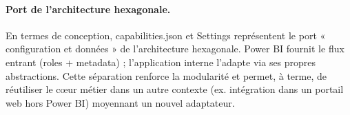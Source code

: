 \paragraph{Port de l’architecture hexagonale.} En termes de conception, capabilities.json et Settings représentent le port « configuration et données » de l’architecture hexagonale. Power BI fournit le flux entrant (roles + metadata) ; l’application interne l’adapte via ses propres abstractions. Cette séparation renforce la modularité et permet, à terme, de réutiliser le cœur métier dans un autre contexte (ex. intégration dans un portail web hors Power BI) moyennant un nouvel adaptateur.

